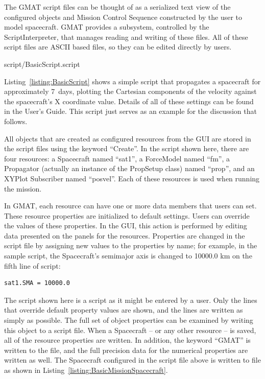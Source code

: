 The GMAT script files can be thought of as a serialized text view of the configured objects and
Mission Control Sequence constructed by the user to model spacecraft.  GMAT provides a subsystem,
controlled by the ScriptInterpreter, that manages reading and writing of these files.  All of these
script files are ASCII based files, so they can be edited directly by users.

\lstset{numbers=left}

{script/BasicScript.script}
\lstset{numbers=none}

Listing~\ref{listing:BasicScript} shows a simple script that propagates a spacecraft for
approximately 7~days, plotting the Cartesian components of the velocity against the spacecraft's X
coordinate value.  Details of all of these settings can be found in the User's
Guide\cite{userGuide}. This script just serves as an example for the discussion that follows.

All objects that are created as configured resources from the GUI are stored in the script files
using the keyword ``Create''.  In the script shown here, there are four resources: a Spacecraft
named ``sat1'', a ForceModel named ``fm'', a Propagator (actually an instance of the PropSetup
class) named ``prop'', and an XYPlot Subscriber named ``posvel''.  Each of these resources is used
when running the mission.

In GMAT, each resource can have one or more data members that users can set.  These resource
properties are initialized to default settings.  Users can override the values of these properties.
In the GUI, this action is performed by editing data presented on the panels for the resources.
Properties are changed in the script file by assigning new values to the properties by name; for
example, in the sample script, the Spacecraft's semimajor axis is changed to 10000.0 km on the fifth
line of script:

\begin{lstlisting}
sat1.SMA = 10000.0
\end{lstlisting}

\noindent The script shown here is a script as it might be entered by a user.  Only the lines that
override default property values are shown, and the lines are written as simply as possible.  The
full set of object properties can be examined by writing this object to a script file.  When a
Spacecraft -- or any other resource -- is saved, all of the resource properties are written.  In
addition, the keyword ``GMAT'' is written to the file, and the full precision data for the numerical
properties are written as well.  The Spacecraft configured in the script file above is written to
file as shown in Listing~\ref{listing:BasicMissionSpacecraft}.

